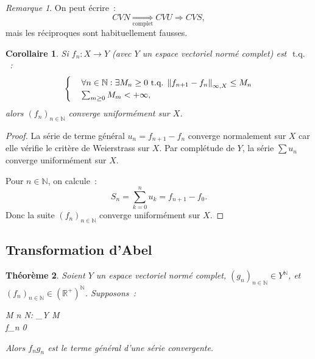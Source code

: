 \documentclass{report}
\newtheorem{thm}{Théorème}[chapter]
\newtheorem{cor}[thm]{Corollaire}
\theoremstyle{definition}
\theoremstyle{remark}
\newtheorem*{rmq}{Remarque}
\numberwithin{equation}{section}
\newcommand{\R}{\mathbb R}
\newcommand{\Rp}{\R^{+}}
\newcommand{\N}{\mathbb N}
\newcommand{\tq}{\text{ t.q. }}
\newcommand{\seq}[3]{\left(#1_{#2}\right)_{#2 \in #3}}
\newcommand{\mconv}[3]{\xrightarrow[#1 \to #2]{#3}}
\newcommand{\pinfty}{{+\infty}}
\newcommand{\evn}{espace vectoriel normé}
\newcommand{\evnc}{{\evn} complet}
\begin{document}
			\begin{rmq} On peut écrire~:
			\begin{equation}
				CVN \underset {\text{complet}}\Rightarrow CVU \Rightarrow CVS,
			\end{equation}
			mais les réciproques sont habituellement fausses.
			\end{rmq}
			\begin{cor} Si $f_n : X \to Y$ (avec $Y$ un \evnc) est $\tq$~:
			\begin{align}
				\begin{cases}
					&\forall n \in \N : \exists M_n \geq 0 \tq \norm {f_{n+1} - f_n}_{\infty, X} \leq M_n \\
					&\sum_{m \geq 0}M_m < \pinfty,
				\end{cases}
			\end{align}
			alors $\seq fn\N$ converge uniformément sur $X$.
			\end{cor}

			\begin{proof} La série de terme général $u_n = f_{n+1}-f_n$ converge normalement sur $X$ car elle vérifie le critère de Weierstrass sur $X$. Par
			complétude de $Y$, la série $\sum u_n$ converge uniformément sur $X$.

			Pour $n \in \N$, on calcule~:
			\begin{equation}
				S_n = \sum_{k=0}^nu_k = f_{n+1}-f_0.
			\end{equation}
			Donc la suite $\seq fn\N$ converge uniformément sur $X$.
			\end{proof}

		\subsection{Transformation d'Abel}
			\begin{thm} Soient $Y$ un \evnc, $\seq gn\N \in Y^{\N}$, et $\seq fn\N \in (\Rp)^{\N}$. Supposons~:
			\begin{numcases}
				\exists M  \tq \forall n \in \N : _Y \leq M \\
				f_n  \mconv n\pinfty{} 0
			\end{numcases}
			Alors $f_ng_n$ est le terme général d'une série convergente.
			\end{thm}
\end{document}
